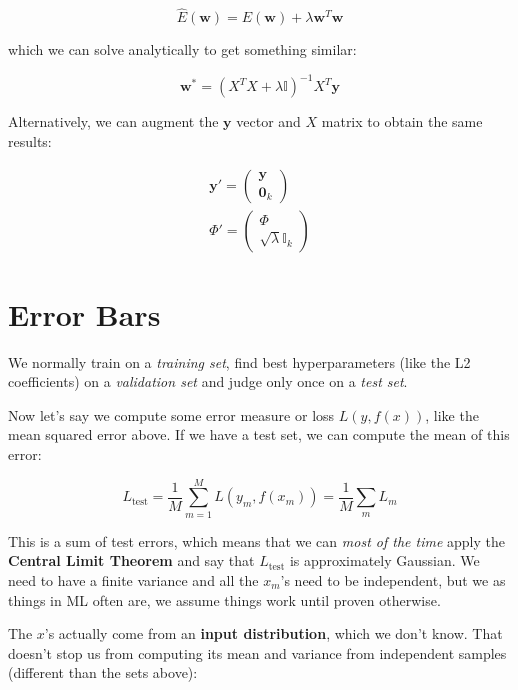 \documentclass{article}
\newcommand{\bm}[1]{\mathbf{#1}}
\newcommand{\id}{\mathbb{I}}
\begin{document}
\begin{equation}
    \hat{E}(\bm{w}) = E(\bm{w}) + \lambda \bm{w}^T\bm{w}
\end{equation}

which we can solve analytically to get something similar:

\begin{equation}
    \bm{w}^* = (X^TX + \lambda \id)^{-1}X^T \bm{y}
\end{equation}

Alternatively, we can augment the $\bm{y}$ vector and $X$ matrix to obtain the same results:

\begin{align*}
    \bm{y}' =
        \begin{pmatrix}
            \bm{y} \\
            \bm{0}_k
        \end{pmatrix} \\
    \Phi' =
        \begin{pmatrix}
            \Phi \\
            \sqrt{\lambda} \id_k
        \end{pmatrix}
\end{align*}

\section{Error Bars}
We normally train on a \textit{training set}, find best hyperparameters (like the L2 coefficients) on a \textit{validation set} and judge only once on a \textit{test set}.

Now let's say we compute some error measure or loss $L(y, f(x))$, like the mean squared error above. If we have a test set, we can compute the mean of this error:

\begin{equation}
    L_\text{test} = \frac{1}{M} \sum_{m=1}^M L(y_m, f(x_m)) = \frac{1}{M} \sum_m L_m
\end{equation}

This is a sum of test errors, which means that we can \textit{most of the time} apply the \textbf{Central Limit Theorem} and say that $L_\text{test}$ is approximately Gaussian. We need to have a finite variance and all the $x_m$'s need to be independent, but we as things in ML often are, we assume things work until proven otherwise.

\vskip 0.1in
The $x$'s actually come from an \textbf{input distribution}, which we don't know. That doesn't stop us from computing its mean and variance from independent samples (different than the sets above):
\end{document}
